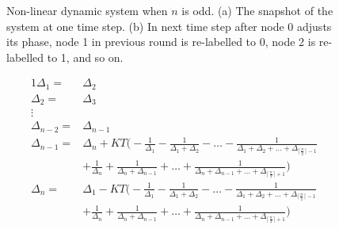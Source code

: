 \begin{figure}[!t]
{	
}
\caption{Non-linear dynamic system when $n$ is odd. (a) The snapshot of the system at one time step. (b) In next time step after node 0 adjusts its phase, node 1 in previous round is re-labelled to 0, node 2 is re-labelled to 1, and so on.}
\label{fig:n-odd}
\lofcont
\end{figure}
\begin{alignat}{1}
 \Delta_{1} =& \Delta_{2} \nonumber \\
 \Delta_{2} =& \Delta_{3} \nonumber \\
 \vdots \nonumber \\
 \Delta_{n-2} =& \Delta_{n-1} \nonumber \\
 \Delta_{n-1} =& \Delta_{n} + KT\Bigg( -\frac{1}{\Delta_{1}} - \frac{1}{\Delta_{1} + \Delta_{2}} - \hdots - \frac{1}{\Delta_{1} + \Delta_{2} + \hdots + \Delta_{\lceil{\frac{n}{2}}\rceil-1}} \nonumber \\ 
&+ \frac{1}{\Delta_{n}} + \frac{1}{\Delta_{n} + \Delta_{n-1}} + \hdots + \frac{1}{\Delta_{n} + \Delta_{n-1} + \hdots + \Delta_{\lceil\frac{n}{2}\rceil+1}}\Bigg) \nonumber \\
 \Delta_{n} =& \Delta_{1} - KT\Bigg( -\frac{1}{\Delta_{1}} - \frac{1}{\Delta_{1} + \Delta_{2}} - \hdots - \frac{1}{\Delta_{1} + \Delta_{2} + \hdots + \Delta_{\lceil\frac{n}{2}\rceil-1}} \nonumber \\ 
&+ \frac{1}{\Delta_{n}} + \frac{1}{\Delta_{n} + \Delta_{n-1}} + \hdots + \frac{1}{\Delta_{n} + \Delta_{n-1} + \hdots + \Delta_{\lceil\frac{n}{2}\rceil+1}}\Bigg) \nonumber 
\end{alignat}
